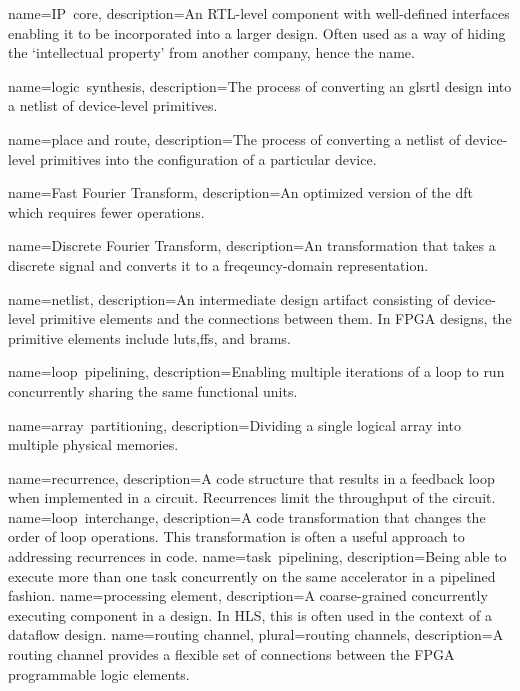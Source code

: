 {
	name={IP~core},
	description={An RTL-level component with well-defined interfaces enabling it to be incorporated into a larger design.  Often used as a way of hiding the `intellectual property' from another company, hence the name.}
} 

{
	name={logic~synthesis},
	description={The process of converting an gls{rtl} design into a netlist of device-level primitives.}
}

{
	name={place and route},
	description={The process of converting a netlist of device-level primitives into the configuration of a particular device.}
} 

{
	name={Fast Fourier Transform},
    	description={An optimized version of the \gls{dft} which requires fewer operations.}
}

{
	name={Discrete Fourier Transform},
    	description={An transformation that takes a discrete signal and converts it to a freqeuncy-domain representation.}
}

{
	name={netlist},
	description={An intermediate design artifact consisting of device-level primitive elements and the connections between them.  In FPGA designs, the primitive elements include \glspl{lut},\glspl{ff}, and \glspl{bram}.}
} 

{
	name={loop~pipelining},
	description={Enabling multiple iterations of a loop to run concurrently sharing the same functional units.}
} 

{
	name={array~partitioning},
	description={Dividing a single logical array into multiple physical memories.}
} 

{
	name={recurrence},
	description={A code structure that results in a feedback loop when implemented in a circuit.  Recurrences limit the throughput of the circuit.}
} 
{
	name={loop~interchange},
	description={A code transformation that changes the order of loop operations.   This transformation is often a useful approach to addressing recurrences in code.}
} 
{
	name={task~pipelining},
	description={Being able to execute more than one task concurrently on the same accelerator in a pipelined fashion.}
} 
{
	name={processing element},
	description={A coarse-grained concurrently executing component in a design.  In HLS, this is often used in the context of a dataflow design.}
} 
{
	name={routing channel},
	plural={routing channels},
	description={A routing channel provides a flexible set of connections between the FPGA programmable logic elements. }
}

